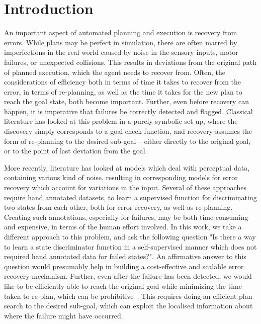 \section{Introduction}\label{sec:intro}
An important aspect of automated planning and execution is recovery from errors. While plans may be perfect in simulation, there are often marred by imperfections in the real world caused by noise in the sensory inputs, motor failures, or unexpected collisions. This results in deviations from the original path of planned execution, which the agent needs to recover from. Often, the considerations of efficiency both in terms of time it takes to recover from the error, in terms of re-planning, as well as the time it takes for the new plan to reach the goal state, both become important. Further, even before recovery can happen, it is imperative that failures be correctly detected and flagged. Classical literature has looked at this problem in a purely symbolic set-up, where the discovery simply corresponds to a goal check function, and recovery assumes the form of re-planning to the desired sub-goal -- either directly to the original goal, or to the point of last deviation from the goal. 

More recently, literature has looked at models which deal with perceptual data, containing various kind of noise, resulting in corresponding models for error recovery which account for variations in the input. Several of these approaches require hand annotated datasets, to learn a supervised function for discriminating two states from each other, both for error recovery, as well as re-planning. Creating such annotations, especially for failures, may be both time-consuming and expensive, in terms of the human effort involved. In this work, we take a different approach to this problem, and ask the following question "Is there a way to learn a state discriminator function in a self-supervised manner which does not required hand annotated data for failed states?". An affirmative answer to this question would presumably help in building a cost-effective and scalable error recovery mechanism. Further, even after the failure has been detected, we would like to be efficiently able to reach the original goal while minimizing the time taken to re-plan, which can be prohibitive~\cite{fox2006plan}. This requires doing an efficient plan search to the desired sub-goal, which can exploit the localised information about where the failure might have occurred. 

